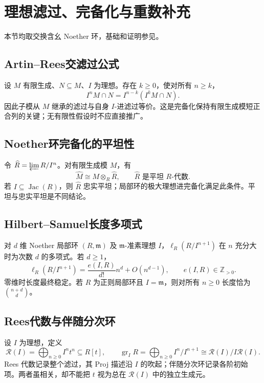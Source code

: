 \documentclass[../main.tex]{subfiles}
\begin{document}
\section{理想滤过、完备化与重数补充}
本节均取交换含幺 Noether 环，基础和证明参见\cite{milneCA,stacks}。
\subsection{Artin--Rees交滤过公式}
设 $M$ 有限生成、$N\subseteq M$、$I$ 为理想。存在 $k\ge0$，使对所有 $n\ge k$，
\[
I^nM\cap N=I^{n-k}(I^kM\cap N).
\]
因此子模从 $M$ 继承的滤过与自身 $I$-进滤过等价。这是完备化保持有限生成模短正合列的关键；无有限性假设时不应直接推广。
\subsection{Noether环完备化的平坦性}
令 $\widehat R=\varprojlim R/I^n$。对有限生成模 $M$，有
\[
\widehat M\cong M\otimes_R\widehat R,\qquad
\widehat R\text{ 是平坦 }R\text{-代数}.
\]
若 $I\subseteq\operatorname{Jac}(R)$，则 $\widehat R$ 忠实平坦；局部环的极大理想进完备化满足此条件。平坦与忠实平坦是不同结论。
\subsection{Hilbert--Samuel长度多项式}
对 $d$ 维 Noether 局部环 $(R,\mathfrak m)$ 及 $\mathfrak m$-准素理想 $I$，$\ell_R(R/I^{n+1})$ 在 $n$ 充分大时为次数 $d$ 的多项式。若 $d\ge1$，
\[
\ell_R(R/I^{n+1})=\frac{e(I,R)}{d!}n^d+O(n^{d-1}),\qquad e(I,R)\in\mathbb Z_{>0}.
\]
零维时长度最终稳定。若 $R$ 为正则局部环且 $I=\mathfrak m$，则对所有 $n\ge0$ 长度恰为 $\binom{n+d}{d}$。
\subsection{Rees代数与伴随分次环}
设 $I$ 为理想，定义
\[
\mathcal R(I)=\bigoplus_{n\ge0}I^nt^n\subseteq R[t],\qquad
\operatorname{gr}_I R=\bigoplus_{n\ge0}I^n/I^{n+1}
\cong\mathcal R(I)/I\mathcal R(I).
\]
Rees 代数记录整个滤过，其 Proj 描述沿 $I$ 的吹起；伴随分次环记录各阶初始项。两者虽相关，却不能把 $t$ 视为总在 $\mathcal R(I)$ 中的独立生成元。
\clearpage
\end{document}
